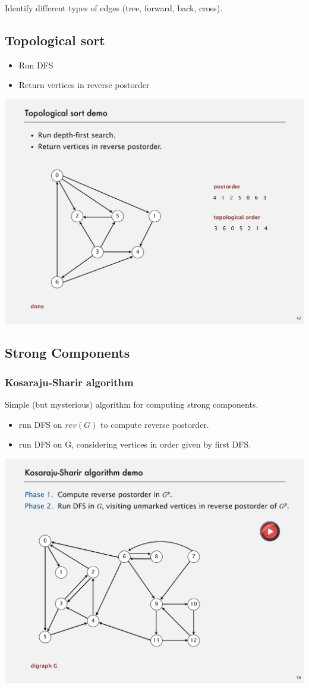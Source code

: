 \documentclass[12pt]{article}
\begin{document}
Identify different types of edges (tree, forward, back, cross).


\subsection{Topological sort}

\begin{itemize}
    \item Run DFS
    \item Return vertices in reverse postorder
\end{itemize}
\includegraphics[scale=.5]{w07-graph5.pdf}

\clearpage
\subsection{Strong Components}

\subsubsection*{Kosaraju-Sharir algorithm}

Simple (but mysterious) algorithm for computing strong components.
\begin{itemize}
    \item run DFS on $rev(G)$ to compute reverse postorder.
    \item run DFS on G, considering vertices in order given by first DFS.
\end{itemize}

\includegraphics[scale=.5]{w07-graph6.pdf}
\end{document}
